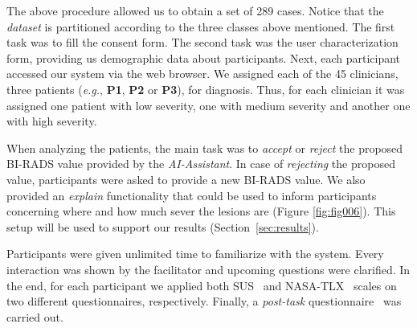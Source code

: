 The above procedure allowed us to obtain a set of 289 cases.
Notice that the {\it dataset} is partitioned according to the three classes above mentioned.
The first task was to fill the consent form.
The second task was the user characterization form, providing us demographic data about participants.
Next, each participant accessed our system via the web browser.
We assigned each of the 45 clinicians, three patients ({\it e.g.}, {\bf P1}, {\bf P2} or {\bf P3}), for diagnosis.
Thus, for each clinician it was assigned one patient with low severity, one with medium severity and another one with high severity.

When analyzing the patients, the main task was to {\it accept} or {\it reject} the proposed BI-RADS value provided by the {\it AI-Assistant}.
In case of {\it rejecting} the proposed value, participants were asked to provide a new BI-RADS value.
We also provided an {\it explain} functionality that could be used to inform participants concerning where and how much sever the lesions are (Figure \ref{fig:fig006}).
This setup will be used to support our results (Section~\ref{sec:results}).

Participants were given unlimited time to familiarize with the system.
Every interaction was shown by the facilitator and upcoming questions were clarified.
In the end, for each participant we applied both SUS\footnotemark[6]~\cite{Tyllinen:2016:WNN:2858036.2858570} and NASA-TLX\footnotemark[7]~\cite{grier2015high, ramkumar2017using} scales on two different questionnaires, respectively.
Finally, a {\it post-task} questionnaire~\cite{https://doi.org/10.13140/rg.2.2.16566.14403/1} was carried out.



